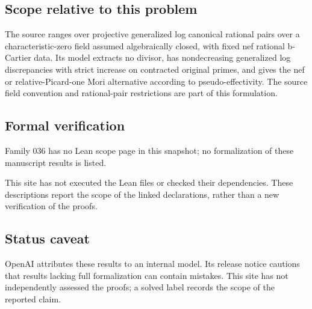 \documentclass[11pt]{article}
\begin{document}
\subsection{Scope relative to this problem}
The source ranges over projective generalized log canonical rational pairs over a characteristic-zero field assumed algebraically closed, with fixed nef rational b-Cartier data. Its model extracts no divisor, has nondecreasing generalized log discrepancies with strict increase on contracted original primes, and gives the nef or relative-Picard-one Mori alternative according to pseudo-effectivity. The source field convention and rational-pair restrictions are part of this formulation.

\subsection{Formal verification}
Family 036 has no Lean scope page in this snapshot; no formalization of these manuscript results is listed.

This site has not executed the Lean files or checked their dependencies. These descriptions report the scope of the linked declarations, rather than a new verification of the proofs.

\subsection{Status caveat}
OpenAI attributes these results to an internal model. Its release notice cautions that results lacking full formalization can contain mistakes. This site has not independently assessed the proofs; a solved label records the scope of the reported claim.
\end{document}
